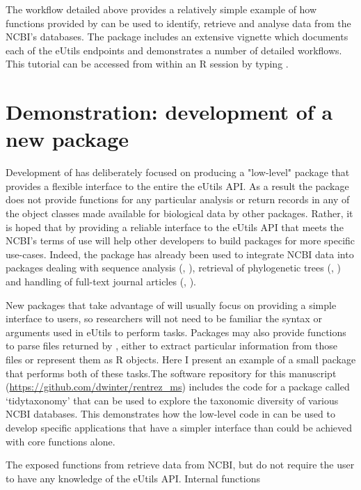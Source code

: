The workflow detailed above provides a relatively simple example of how functions
provided by  can be used to identify, retrieve and analyse data
from the NCBI's databases. The package includes an extensive vignette which
documents each of the eUtils endpoints and demonstrates a number of detailed
workflows. This tutorial can be accessed from within an R session by typing 
.

\section{Demonstration: development of a new package}

Development of  has deliberately focused on producing a "low-level"
package that provides a flexible interface to the entire the eUtils API. As a 
result the package does not provide functions for any particular analysis
or return records in any of the object classes made available for biological
data by other packages. Rather, it is hoped that by providing a reliable interface
to the eUtils API that meets the NCBI's terms of use  will help 
other developers to build packages for more specific use-cases. Indeed, the
package has already been used to integrate NCBI data into packages dealing
with sequence analysis (, \citealt{genbankr}), retrieval of
phylogenetic trees (, \citealt{rotl}) and handling of
full-text journal articles (, \citealt{fulltext}).

New packages that take advantage of  will usually focus on
providing a simple interface to users, so researchers will not need to be
familiar the syntax or arguments used in eUtils to perform tasks. Packages may
also provide functions to parse files returned by , either
to extract particular information from those files or represent them as R 
objects. Here I present an example of a small package that performs both of
these tasks.The software repository for this manuscript
(\url{https://github.com/dwinter/rentrez_ms}) includes the code for a package 
called `tidytaxonomy' that can be used to explore the taxonomic
diversity of various NCBI databases. This demonstrates how the 
low-level code in  can be used to develop specific applications 
that have a simpler interface than could be achieved with core 
 functions alone.

The exposed functions from  retrieve data from NCBI, but do not
require the user to have any knowledge of the eUtils API. Internal functions

